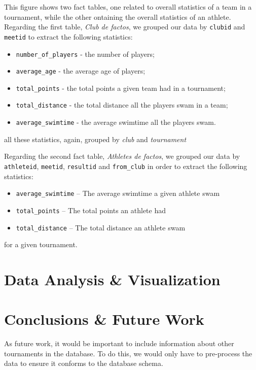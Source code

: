 \documentclass[a4paper, 11pt]{article}
\begin{document}
    This figure shows two fact tables, one related to overall statistics of a team in a tournament, while the other
    ontaining the overall statistics of an athlete.
    Regarding the first table, \textit{Club de factos}, we grouped our data by \texttt{clubid} and \texttt{meetid} to extract
    the following statistics:

    \begin{itemize}
        \item \texttt{number\_of\_players} - the number of players;
        \item \texttt{average\_age} - the average age of players;
        \item \texttt{total\_points} - the total points a given team had in a tournament;
        \item \texttt{total\_distance} - the total distance all the players swam in a team;
        \item \texttt{average\_swimtime} - the average swimtime all the players swam.
    \end{itemize}

    all these statistics, again, grouped by \textit{club} and \textit{tournament}

    Regarding the second fact table, \textit{Athletes de factos}, we grouped our data by \texttt{athleteid}, \texttt{meetid},
    \texttt{resultid} and \texttt{from\_club} in order to extract the following statistics:

    \begin{itemize}
        \item \texttt{average\_swimtime} -- The average swimtime a given athlete swam
        \item \texttt{total\_points} -- The total points an athlete had
        \item \texttt{total\_distance} -- The total distance an athlete swam
    \end{itemize}

    for a given tournament.

    \pagebreak


    \section{Data Analysis \& Visualization} \label{sec:analysis}
    

    \pagebreak


    \section{Conclusions \& Future Work} \label{sec:conclusion}

    As future work, it would be important to include information about other tournaments in the database.
    To do this, we would only have to pre-process the data to ensure it conforms to the database schema. %
\end{document}
